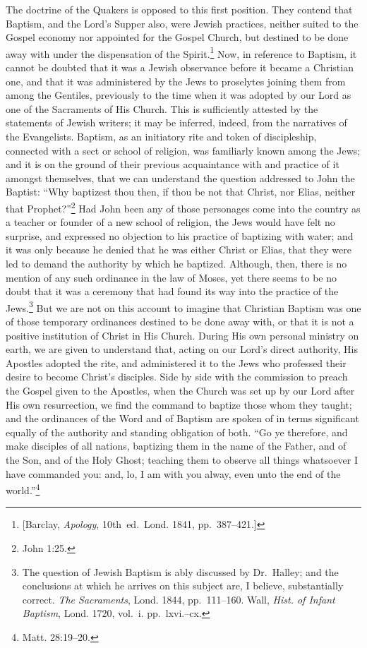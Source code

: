 \documentclass[
  english,
]{book}
\begin{document}
The doctrine of the Quakers is opposed to this first position. They contend that Baptism, and the Lord's Supper also, were Jewish practices, neither suited to the Gospel economy nor appointed for the Gospel Church, but destined to be done away with under the dispensation of the Spirit.\footnote{{[}Barclay, \emph{Apology}, 10th~ed.~Lond. 1841, pp.~387--421.{]}} Now, in reference to Baptism, it cannot be doubted that it was a Jewish observance before it became a Christian one, and that it was administered by the Jews to proselytes joining them from among the Gentiles, previously to the time when it was adopted by our Lord as one of the Sacraments of His Church. This is sufficiently attested by the statements of Jewish writers; it may be inferred, indeed, from the narratives of the Evangelists. Baptism, as an initiatory rite and token of discipleship, connected with a sect or school of religion, was familiarly known among the Jews; and it is on the ground of their previous acquaintance with and practice of it amongst themselves, that we can understand the question addressed to John the Baptist: ``Why baptizest thou then, if thou be not that Christ, nor Elias, neither that Prophet?''\footnote{John 1:25.} Had John been any of those personages come into the country as a teacher or founder of a new school of religion, the Jews would have felt no surprise, and expressed no objection to his practice of baptizing with water; and it was only because he denied that he was either Christ or Elias, that they were led to demand the authority by which he baptized. Although, then, there is no mention of any such ordinance in the law of Moses, yet there seems to be no doubt that it was a ceremony that had found its way into the practice of the Jews.\footnote{The question of Jewish Baptism is ably discussed by Dr.~Halley; and the conclusions at which he arrives on this subject are, I believe, substantially correct. \emph{The Sacraments}, Lond. 1844, pp.~111--160. Wall, \emph{Hist. of Infant Baptism}, Lond. 1720, vol.~i. pp.~lxvi.--cx.} But we are not on this account to imagine that Christian Baptism was one of those temporary ordinances destined to be done away with, or that it is not a positive institution of Christ in His Church. During His own personal ministry on earth, we are given to understand that, acting on our Lord's direct authority, His Apostles adopted the rite, and administered it to the Jews who professed their desire to become Christ's disciples. Side by side with the commission to preach the Gospel given to the Apostles, when the Church was set up by our Lord after His own resurrection, we find the command to baptize those whom they taught; and the ordinances of the Word and of Baptism are spoken of in terms significant equally of the authority and standing obligation of both. ``Go ye therefore, and make disciples of all nations, baptizing them in the name of the Father, and of the Son, and of the Holy Ghost; teaching them to observe all things whatsoever I have commanded you: and, lo, I am with you alway, even unto the end of the world.''\footnote{Matt. 28:19--20.}
\end{document}

